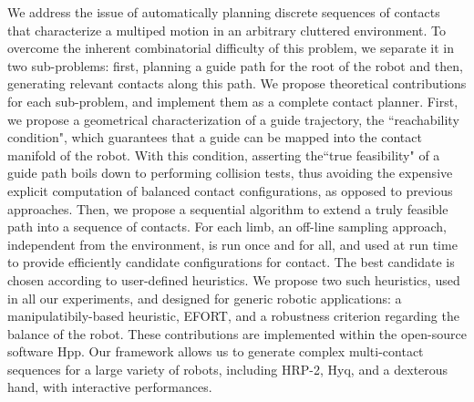 We address the issue of automatically planning discrete sequences of contacts
that characterize a multiped motion in an arbitrary cluttered environment.
To overcome the inherent combinatorial difficulty of this problem, we separate it
in two sub-problems: first, planning a guide path for the root of the robot and
then, generating relevant contacts along this path.
We propose theoretical contributions for each sub-problem, and implement them
as a complete contact planner. 
First, we propose a geometrical characterization of a guide trajectory, the ``reachability condition", which guarantees that a
guide can be mapped into the contact manifold of the robot. With this condition, asserting the``true feasibility" 
of a guide path boils down to performing collision tests, thus avoiding the expensive explicit computation of balanced contact configurations, as opposed to previous approaches.
Then, we propose a sequential algorithm to extend a truly feasible path into a sequence of contacts. For each limb, an off-line sampling approach,
independent from the environment, is run once and for all, and used at run time to provide efficiently candidate configurations for contact.
The best candidate is chosen according to user-defined heuristics. We propose two such heuristics, used in all our experiments, and 
designed for generic robotic applications: a manipulatibily-based heuristic, EFORT, and a robustness criterion regarding the balance of the robot.
These contributions are implemented within the open-source software Hpp. Our framework allows us to generate complex multi-contact sequences for a large
variety of robots, including HRP-2, Hyq, and a dexterous hand, with interactive performances.
